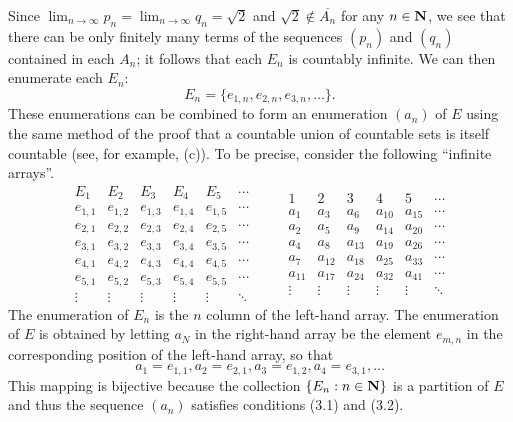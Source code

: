 \documentclass{lew98_solutions}
\begin{document}
\begin{solution}
\begin{enumerate}
        Since \( \lim_{n \to \infty} p_n = \lim_{n \to \infty} q_n = \sqrt{2} \) and \( \sqrt{2} \not\in \overline{A_n} \) for any \( n \in \mathbf{N} \), we see that there can be only finitely many terms of the sequences \( (p_n) \) and \( (q_n) \) contained in each \( A_n \); it follows that each \( E_n \) is countably infinite. We can then enumerate each \( E_n \):
        \[
            E_n = \{ e_{1,n}, e_{2,n}, e_{3,n}, \ldots \}.
        \]
        These enumerations can be combined to form an enumeration \( (a_n) \) of \( E \) using the same method of the proof that a countable union of countable sets is itself countable (see, for example,  (c)). To be precise, consider the following ``infinite arrays''.
        \[
            \begin{array}{cccccc}
                E_1 & E_2 & E_3 & E_4 & E_5 & \cdots \\
                \hline
                e_{1,1} & e_{1,2} & e_{1,3} & e_{1,4} & e_{1,5} & \cdots \\[2mm]
                e_{2,1} & e_{2,2} & e_{2,3} & e_{2,4} & e_{2,5} & \cdots \\[2mm]
                e_{3,1} & e_{3,2} & e_{3,3} & e_{3,4} & e_{3,5} & \cdots \\[2mm]
                e_{4,1} & e_{4,2} & e_{4,3} & e_{4,4} & e_{4,5} & \cdots \\[2mm]
                e_{5,1} & e_{5,2} & e_{5,3} & e_{5,4} & e_{5,5} & \cdots \\[2mm]
                \vdots & \vdots & \vdots & \vdots & \vdots & \ddots
            \end{array}
            \qquad
            \begin{array}{cccccc}
                1 & 2 & 3 & 4 & 5 & \cdots \\
                \hline
                a_1 & a_3 & a_6 & a_{10} & a_{15} & \cdots \\[2mm]
                a_2 & a_5 & a_9 & a_{14} & a_{20} & \cdots \\[2mm]
                a_4 & a_8 & a_{13} & a_{19} & a_{26} & \cdots \\[2mm]
                a_7 & a_{12} & a_{18} & a_{25} & a_{33} & \cdots \\[2mm]
                a_{11} & a_{17} & a_{24} & a_{32} & a_{41} & \cdots \\[2mm]
                \vdots & \vdots & \vdots & \vdots & \vdots & \ddots
            \end{array}
        \]
        The enumeration of \( E_n \) is the \( n \) column of the left-hand array. The enumeration of \( E \) is obtained by letting \( a_N \) in the right-hand array be the element \( e_{m,n} \) in the corresponding position of the left-hand array, so that
        \[
            a_1 = e_{1,1}, a_2 = e_{2,1}, a_3 = e_{1,2}, a_4 = e_{3,1}, \ldots
        \]
        This mapping is bijective because the collection \( \{ E_n : n \in \mathbf{N} \} \) is a partition of \( E \) and thus the sequence \( (a_n) \) satisfies conditions (3.1) and (3.2).


\end{enumerate}
\end{solution}
\end{document}
